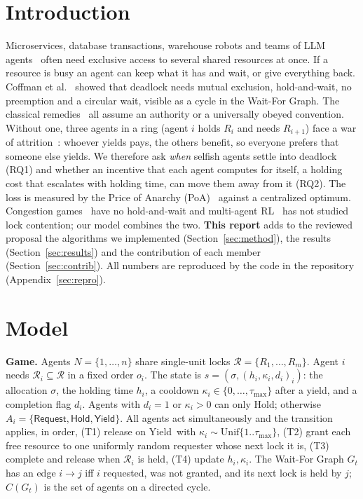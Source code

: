 \documentclass[10pt]{article}
\newcommand{\Req}{\textsf{Request}}
\newcommand{\Hold}{\textsf{Hold}}
\newcommand{\Yield}{\textsf{Yield}}
\begin{document}
\section{Introduction}
Microservices, database transactions, warehouse robots and teams of LLM agents~\cite{guo} often need exclusive access to
several shared resources at once. If a resource is busy an agent can keep what it has and wait, or give everything back.
Coffman et al.~\cite{coffman} showed that deadlock needs mutual exclusion, hold-and-wait, no preemption and a circular
wait, visible as a cycle in the Wait-For Graph. The classical remedies~\cite{dijkstra,havender} all assume an authority or
a universally obeyed convention. Without one, three agents in a ring (agent $i$ holds $R_i$ and needs $R_{i+1}$) face a war
of attrition~\cite{maynard}: whoever yields pays, the others benefit, so everyone prefers that someone else yields.
We therefore ask \emph{when} selfish agents settle into deadlock (RQ1) and whether an incentive that each agent computes
for itself, a holding cost that escalates with holding time, can move them away from it (RQ2). The loss is measured by the
Price of Anarchy (PoA)~\cite{kp,roughgarden} against a centralized optimum. Congestion games~\cite{rosenthal} have no
hold-and-wait and multi-agent RL~\cite{busoniu} has not studied lock contention; our model combines the two.
\textbf{This report} adds to the reviewed proposal the algorithms we implemented (Section~\ref{sec:method}), the results
(Section~\ref{sec:results}) and the contribution of each member (Section~\ref{sec:contrib}). All numbers are reproduced by
the code in the repository (Appendix~\ref{sec:repro}).

\section{Model}\label{sec:model}
\textbf{Game.} Agents $N=\{1,\dots,n\}$ share single-unit locks $\mathcal R=\{R_1,\dots,R_m\}$. Agent $i$ needs
$\mathcal R_i\subseteq\mathcal R$ in a fixed order $o_i$. The state is $s=(\sigma,(h_i,\kappa_i,d_i)_i)$: the allocation
$\sigma$, the holding time $h_i$, a cooldown $\kappa_i\in\{0,\dots,\tau_{\max}\}$ after a yield, and a completion flag
$d_i$. Agents with $d_i=1$ or $\kappa_i>0$ can only \Hold; otherwise $A_i=\{\Req,\Hold,\Yield\}$. All agents act
simultaneously and the transition applies, in order, (T1) release on \Yield\ with $\kappa_i\sim\mathrm{Unif}\{1..\tau_{\max}\}$,
(T2) grant each free resource to one uniformly random requester whose next lock it is, (T3) complete and release when
$\mathcal R_i$ is held, (T4) update $h_i,\kappa_i$. The Wait-For Graph $G_t$ has an edge $i\to j$ iff $i$ requested,
was not granted, and its next lock is held by $j$; $C(G_t)$ is the set of agents on a directed cycle.
\end{document}
